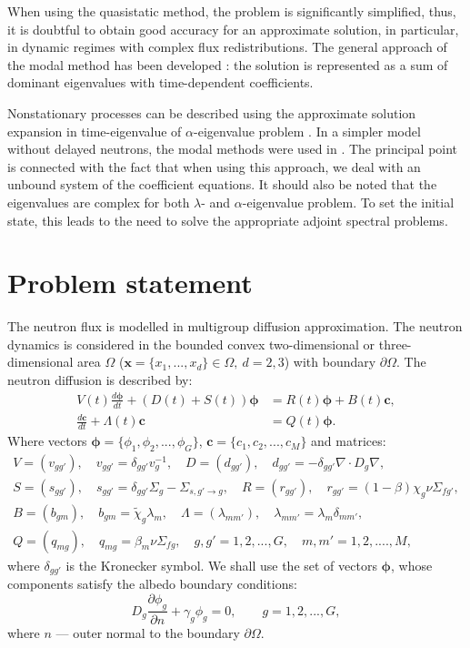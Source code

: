 \documentclass[a4paper]{jpconf}
\begin{document}
When using the quasistatic method, the problem is significantly simplified, thus, it is doubtful to obtain good accuracy for an approximate solution, in particular, in dynamic regimes with complex flux redistributions. The general approach of the modal method has been  developed  \cite{stacey1967modal}:
the solution is represented as a sum of dominant eigenvalues with time-dependent coefficients.

Nonstationary processes can be described using the approximate solution expansion in time-eigenvalue of  $\alpha$-eigenvalue problem \cite{verdu20103d}.
In a simpler model without delayed neutrons, the modal methods were used in  \cite{modak2007scheme}.
The principal point is connected with the fact that when using this approach, we deal with an unbound system of the coefficient equations. It should also be noted that the eigenvalues are complex for both   $\lambda$- and 
$\alpha$-eigenvalue problem. To set the initial state, this leads to the need to solve the appropriate adjoint spectral problems.

\section{Problem statement}
The neutron flux is modelled in multigroup diffusion approximation. The neutron dynamics is considered in the bounded convex two-dimensional or three-dimensional area  $\Omega$ ($\bm x = \{x_1, ..., x_d\} \in \Omega, \ d = 2,3$) with boundary $\partial \Omega$. The neutron diffusion is described by:
\begin{equation}\label{1}
\begin{split}
V(t) \frac{d \bm \phi}{d t} + (D(t)+S(t)) \bm \phi &= R(t) \bm \phi + B(t)\bm c,
\\
\frac{d \bm c}{d t} + \Lambda(t)\bm c &= Q(t) \bm \phi. 
\end{split}
\end{equation}  
Where vectors $\bm \phi = \{\phi_1, \phi_2, ..., \phi_G\}$, $\bm c = \{c_1, c_2, ..., c_M\}$ 
and matrices:
\[
\begin{aligned}
 V = (v_{g g'}), \quad v_{g g'} = \delta_{g g'} v_g^{-1}, \quad 
 D = (d_{g g'}), \quad d_{g g'} = - \delta_{g g'} \nabla \cdot D_g \nabla, \\
 S = (s_{g g'}), \quad  s_{g g'} =  \delta_{g g'} \Sigma_g - \Sigma_{s,g'\rightarrow g}, \quad R  = (r_{g g'}), \quad  r_{g g'} = (1-\beta)\chi_g \nu \Sigma_{fg'}, \\
 B = (b_{g m}), \quad b_{g m}  = \widetilde{\chi}_g \lambda_m, \quad
\Lambda = (\lambda_{m m'}), \quad  \lambda_{m m'} = \lambda_m \delta_{m m'}, \\
 Q = (q_{mg}), \quad  q_{mg}  = \beta_m \nu \Sigma_{fg}, \quad g, g' = 1,2, ..., G, \quad 
 m, m' = 1,2, ....,M,
\end{aligned}
\]
where
$\delta_{g g'}$ is the Kronecker symbol. We shall use the set of vectors $\bm \phi$, whose components 
satisfy the albedo boundary conditions: 
\begin{equation}\label{2}
 D_g\frac{\partial \phi_g}{\partial n} + \gamma_g \phi_g = 0, \quad 
 \quad g = 1,2, ..., G ,
\end{equation}
where $n$ --- outer normal to the boundary $\partial \Omega$.
\end{document}
